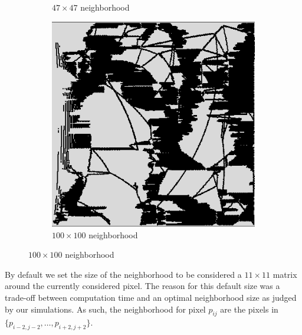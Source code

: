 \begin{figure}[t]
\begin{subfigure}[t]{.15\textwidth}
        \caption{$47\times47$ neighborhood}
        \label{subfig:47x47}
    \end{subfigure}
    \begin{subfigure}[t]{.15\textwidth}
        \includegraphics[width=\textwidth]{Images/segmented_v8_100x100_neighborhood.png}
        \caption{$100\times100$ neighborhood}
        \label{subfig:100x100}
    \end{subfigure}
    
\end{figure}

By default we set the size of the neighborhood to be considered a $11\times11$ matrix around the currently considered pixel. The reason for this default size was a trade-off between computation time and an optimal neighborhood size as judged by our simulations. As such, the neighborhood for pixel $p_{ij}$ are the pixels in $\big\{p_{i-2, j-2}, \dotsc, p_{i+2,j+2}\big\}$.
\\\\

